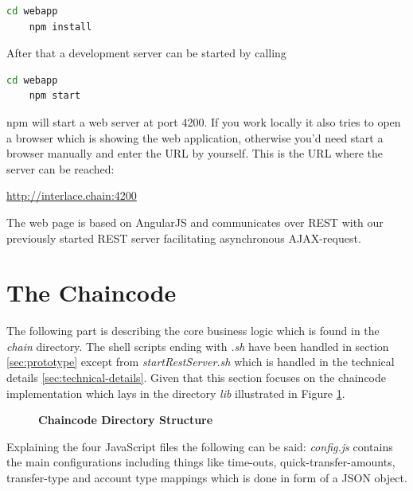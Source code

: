 \begin{lstlisting}[language=bash]
	cd webapp
	npm install
\end{lstlisting}

After that a development server can be started by calling

\begin{lstlisting}[language=bash]
	cd webapp
	npm start
\end{lstlisting}

npm will start a web server at port 4200. If you work locally it also tries to open a browser which is showing the web application, otherwise you'd need start a browser manually and enter the URL by yourself. This is the URL where the server can be reached:

\url{http://interlace.chain:4200}

The web page is based on AngularJS and communicates over REST with our previously started REST server facilitating asynchronous AJAX-request.

\section{The Chaincode}
\label{sec:chaincode}

The following part is describing the core business logic which is found in the \textit{chain} directory. The shell scripts ending with \textit{.sh} have been handled in section \ref{sec:prototype} except from \textit{startRestServer.sh} which is handled in the technical details \ref{sec:technical-details}. Given that this section focuses on the chaincode implementation which lays in the directory \textit{lib} illustrated in Figure \ref{fig:chain-structure}.

\begin{figure}[htbp]
\centering
\begin{minipage}{5cm}
\end{minipage}
\caption{\bf\small Chaincode Directory Structure}
\label{fig:chain-structure}
\end{figure}


Explaining the four JavaScript files the following can be said: \textit{config.js} contains the main configurations including things like time-outs, quick-transfer-amounts, transfer-type and account type mappings which is done in form of a JSON object.

